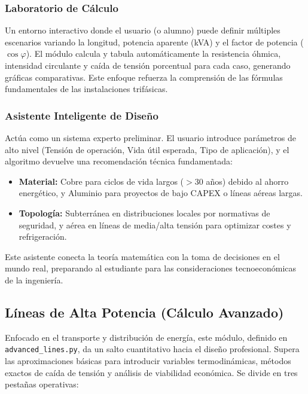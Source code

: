 \documentclass[11pt,a4paper]{article}
\begin{document}
\subsubsection{Laboratorio de Cálculo}
Un entorno interactivo donde el usuario (o alumno) puede definir múltiples escenarios variando la longitud, potencia aparente (kVA) y el factor de potencia ($\cos \varphi$). El módulo calcula y tabula automáticamente la resistencia óhmica, intensidad circulante y caída de tensión porcentual para cada caso, generando gráficas comparativas. Este enfoque refuerza la comprensión de las fórmulas fundamentales de las instalaciones trifásicas.

\subsubsection{Asistente Inteligente de Diseño}
Actúa como un sistema experto preliminar. El usuario introduce parámetros de alto nivel (Tensión de operación, Vida útil esperada, Tipo de aplicación), y el algoritmo devuelve una recomendación técnica fundamentada:
\begin{itemize}
    \item \textbf{Material:} Cobre para ciclos de vida largos ($>$30 años) debido al ahorro energético, y Aluminio para proyectos de bajo CAPEX o líneas aéreas largas.
    \item \textbf{Topología:} Subterránea en distribuciones locales por normativas de seguridad, y aérea en líneas de media/alta tensión para optimizar costes y refrigeración.
\end{itemize}
Este asistente conecta la teoría matemática con la toma de decisiones en el mundo real, preparando al estudiante para las consideraciones tecnoeconómicas de la ingeniería.

\subsection{Líneas de Alta Potencia (Cálculo Avanzado)}
Enfocado en el transporte y distribución de energía, este módulo, definido en \texttt{advanced\_lines.py}, da un salto cuantitativo hacia el diseño profesional. Supera las aproximaciones básicas para introducir variables termodinámicas, métodos exactos de caída de tensión y análisis de viabilidad económica. Se divide en tres pestañas operativas:
\end{document}
